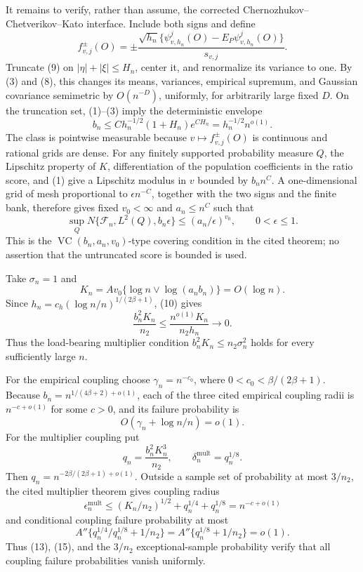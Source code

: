 It remains to verify, rather than assume, the corrected Chernozhukov--Chetverikov--Kato interface.  Include both signs and define
\[
 f_{v,j}^{\pm}(O)=\pm
 \frac{\sqrt{h_n}\{\psi^j_{v,h_n}(O)-E_P\psi^j_{v,h_n}(O)\}}{s_{v,j}}. \tag{9}
\]
Truncate (9) on \(|\eta|+|\xi|\le H_n\), center it, and renormalize its variance to one.  By (3) and (8), this changes its means, variances, empirical supremum, and Gaussian covariance semimetric by \(O(n^{-D})\), uniformly, for arbitrarily large fixed \(D\).  On the truncation set, (1)--(3) imply the deterministic envelope
\[
 b_n\le Ch_n^{-1/2}(1+H_n)e^{CH_n}
 =h_n^{-1/2}n^{o(1)}. \tag{10}
\]
The class is pointwise measurable because \(v\mapsto f_{v,j}^{\pm}(O)\) is continuous and rational grids are dense.  For any finitely supported probability measure \(Q\), the Lipschitz property of \(K\), differentiation of the population coefficients in the ratio score, and (1) give a Lipschitz modulus in \(v\) bounded by \(b_nn^C\).  A one-dimensional grid of mesh proportional to \(\epsilon n^{-C}\), together with the two signs and the finite bank, therefore gives fixed \(v_0<\infty\) and \(a_n\le n^C\) such that
\[
 \sup_QN\{\mathcal F_n,L^2(Q),b_n\epsilon\}
 \le(a_n/\epsilon)^{v_0},
 \qquad 0<\epsilon\le1. \tag{11}
\]
This is the \(\operatorname{VC}(b_n,a_n,v_0)\)-type covering condition in the cited theorem; no assertion that the untruncated score is bounded is used.

Take \(\sigma_n=1\) and
\[
 K_n=Av_0\{\log n\vee\log(a_nb_n)\}=O(\log n).
\]
Since \(h_n=c_h(\log n/n)^{1/(2\beta+1)}\), (10) gives
\[
 \frac{b_n^2K_n}{n_2}
 \le\frac{n^{o(1)}K_n}{n_2h_n}\longrightarrow0. \tag{12}
\]
Thus the load-bearing multiplier condition \(b_n^2K_n\le n_2\sigma_n^2\) holds for every sufficiently large \(n\).

For the empirical coupling choose \(\gamma_n=n^{-c_0}\), where
\(0<c_0<\beta/(2\beta+1)\).  Because
\(b_n=n^{1/(4\beta+2)+o(1)}\), each of the three cited empirical coupling radii is \(n^{-c+o(1)}\) for some \(c>0\), and its failure probability is
\[
 O(\gamma_n+\log n/n)=o(1). \tag{13}
\]
For the multiplier coupling put
\[
 q_n=\frac{b_n^2K_n^3}{n_2},
 \qquad \delta_n^{\mathrm{mult}}=q_n^{1/8}.
\]
Then \(q_n=n^{-2\beta/(2\beta+1)+o(1)}\).  Outside a sample set of probability at most \(3/n_2\), the cited multiplier theorem gives coupling radius
\[
 \epsilon_n^{\mathrm{mult}}
 \le (K_n/n_2)^{1/2}+q_n^{1/4}+q_n^{1/8}
 =n^{-c+o(1)} \tag{14}
\]
and conditional coupling failure probability at most
\[
 A''\{q_n^{1/4}/q_n^{1/8}+1/n_2\}
 =A''\{q_n^{1/8}+1/n_2\}=o(1). \tag{15}
\]
Thus (13), (15), and the \(3/n_2\) exceptional-sample probability verify that all coupling failure probabilities vanish uniformly.

